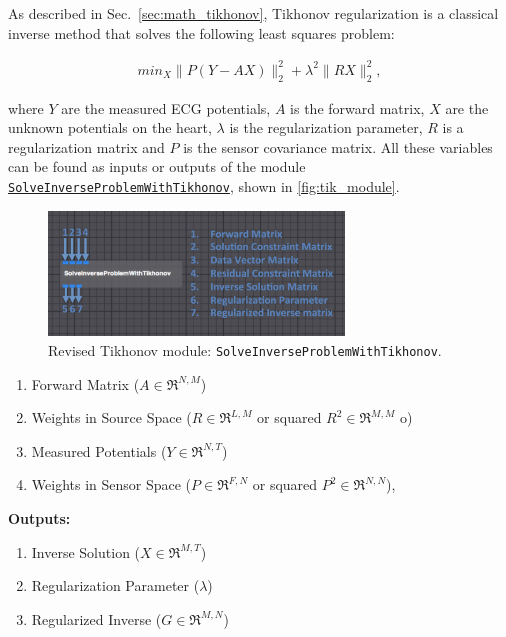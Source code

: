     As described in Sec.~\ref{sec:math_tikhonov}, Tikhonov regularization is a classical inverse method that solves the following least squares problem:
    \begin{center}
        \begin{eqnarray}
            min_{X} \| P (Y - A X) \|^{2}_{2} + \lambda^{2} \| RX \|^{2}_{2},
        \label{eq:inverseSec_tik_problem}
        \end{eqnarray}
    \end{center}
    where $Y$ are the measured ECG potentials, $A$ is the forward matrix, $X$ are the unknown potentials on the heart, $\lambda$ is the regularization parameter, $R$ is a regularization matrix and $P$ is the sensor covariance matrix. 
    All these variables can be found as inputs or outputs of the module \href{http://scirundocwiki.sci.utah.edu/SCIRunDocs/index.php/CIBC:Documentation:SCIRun:Reference:BioPSE:SolveInverseProblemWithTikhonov}{{\tt SolveInverseProblemWithTikhonov}}, shown in \autoref{fig:tik_module}.
    \begin{figure}
        \begin{center}
        \includegraphics[width=0.7\textwidth]{ECGToolkitGuide_figures/tik1.png}
        \caption{Revised Tikhonov module: {\tt SolveInverseProblemWithTikhonov}.  }
        \label{fig:tik_module}
        \end{center}
    \end{figure}
    \begin{enumerate}
        \item Forward Matrix ($A\in\Re^{N,M}$)
        \item Weights in Source Space ($R\in\Re^{L,M}$ or squared $R^2\in\Re^{M,M}$ o)
        \item Measured Potentials ($Y\in\Re^{N,T}$)
        \item Weights in Sensor Space ($P\in\Re^{F,N}$ or squared $P^2\in\Re^{N,N}$),
    \end{enumerate}
    {\bf Outputs:}
     \begin{enumerate}
        \item Inverse Solution ($X\in\Re^{M,T}$)
        \item Regularization Parameter ($\lambda$)
        \item Regularized Inverse ($G\in\Re^{M,N}$)
    \end{enumerate}

